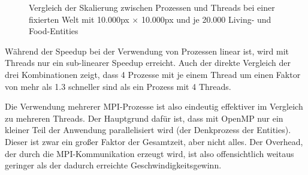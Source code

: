 \documentclass[course=erap]{aspdoc}
\begin{document}
\begin{figure}
\centering
\begin{minipage}{.5\textwidth}
\centering
{}
\end{minipage}%
\begin{minipage}{.5\textwidth}
\centering
{}
\end{minipage}
\caption{Vergleich der Skalierung zwischen Prozessen und Threads bei einer fixierten Welt mit 10.000px $\times$ 10.000px und je 20.000 Living- und Food-Entities}
\label{fig:threads-vs-processes}
\end{figure}

Während der Speedup bei der Verwendung von Prozessen linear ist, wird mit Threads nur ein sub-linearer Speedup erreicht. Auch der direkte Vergleich der drei Kombinationen zeigt, dass 4 Prozesse mit je einem Thread um einen Faktor von mehr als 1.3 schneller sind als ein Prozess mit 4 Threads.

Die Verwendung mehrerer MPI-Prozesse ist also eindeutig effektiver im Vergleich zu mehreren Threads. Der Hauptgrund dafür ist, dass mit OpenMP nur ein kleiner Teil der Anwendung parallelisiert wird (der Denkprozess der Entities). Dieser ist zwar ein großer Faktor der Gesamtzeit, aber nicht alles. Der Overhead, der durch die MPI-Kommunikation erzeugt wird, ist also offensichtlich weitaus geringer als der dadurch erreichte Geschwindigkeitsgewinn.
\end{document}
